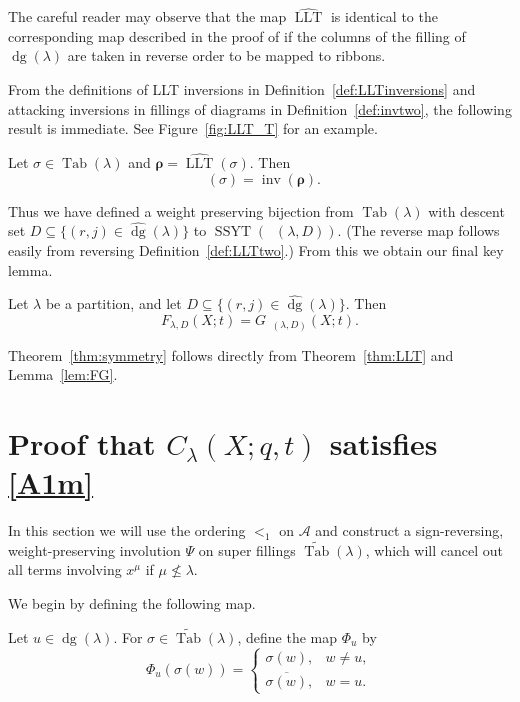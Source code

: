 \documentclass[ALCO,Unicode]{cedram}
\DeclareMathOperator{\PQT}{Tab}
\DeclareMathOperator{\dg}{dg}
\DeclareMathOperator{\inv}{inv}
\DeclareMathOperator{\SSYT}{SSYT}
\DeclareMathOperator{\LLT}{LLT}
\DeclareMathOperator{\boldnu}{\widehat{\boldsymbol{\nu}}}
\DeclareMathOperator{\invtwo}{\widehat{\inv}}
\begin{document}
\begin{remark}
The careful reader may observe that the map $\widehat{\LLT}$ is identical to the corresponding map described in the proof of \cite[Proposition 3.4]{HHL05} if the columns of the filling of $\dg(\lambda)$ are taken in reverse order to be mapped to ribbons.
\end{remark}

From the definitions of LLT inversions in Definition~\ref{def:LLTinversions} and attacking inversions in fillings of diagrams in Definition~\ref{def:invtwo}, the following result is immediate. See Figure~\ref{fig:LLT_T} for an example.

\begin{lemma}\label{lem:LLTtwo}
Let $\sigma\in\PQT(\lambda)$ and $\boldsymbol{\rho}=\widehat{\LLT}(\sigma)$. Then
\[
\invtwo(\sigma) = \inv(\boldsymbol{\rho}).
\]
\end{lemma}


Thus we have defined a weight preserving bijection from $\PQT(\lambda)$ with descent set $D \subseteq \{(r,j) \in \widehat{\dg}(\lambda)\}$ to $\SSYT(\boldnu(\lambda,D))$. (The reverse map follows easily from reversing Definition~\ref{def:LLTtwo}.) From this we obtain our final key lemma.

\begin{lemma}\label{lem:FG}
Let $\lambda$ be a partition, and let $D \subseteq \{(r,j) \in \widehat{\dg}(\lambda)\}$. Then
\[
F_{\lambda,D}(X;t) = G_{\boldnu(\lambda,D)}(X;t).
\]
\end{lemma}

Theorem~\ref{thm:symmetry} follows directly from Theorem~\ref{thm:LLT} and Lemma~\ref{lem:FG}.







\section{Proof that $C_{\lambda}(X;q,t)$ satisfies \eqref{A1m}}
\label{sec:A1m}

In this section we will use the ordering $<_1$ on $\mathcal{A}$ and construct a sign-reversing, weight-preserving involution $\Psi$ on super fillings $\widetilde{\PQT}(\lambda)$, which will cancel out all terms involving $x^{\mu}$ if $\mu \not\leq \lambda$. 

We begin by defining the following map.

\begin{defn}\label{def:Phi_u} 
Let $u\in\dg(\lambda)$. For $\sigma\in\widetilde{\PQT}(\lambda)$, define the map $\Phi_u$ by
\[
\Phi_u(\sigma(w))=\begin{cases} \sigma(w),& w \neq u,\\[0.2cm]
\overline{\sigma(w)},& w=u.
\end{cases}
\]
\end{defn} 
\end{document}
